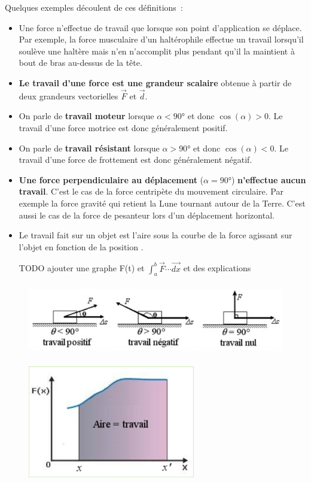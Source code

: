\begin{multicols}{2}
Quelques exemples découlent de ces définitions~:
\begin{itemize}
\item   Une force n'effectue de travail que lorsque son point d'application se
  déplace. Par exemple, la force
musculaire d'un haltérophile effectue un travail lorsqu'il soulève une
haltère mais n'en n'accomplit
plus pendant qu'il la maintient à bout de bras au-dessus de la tête.
\item   \textbf{Le travail d'une force est une grandeur scalaire} obtenue à
  partir de deux grandeurs vectorielles $\vec{F}$ et  $\vec{d}$.
\item   On parle de \textbf{travail moteur} lorsque $\alpha < 90°$ et donc
  $ \cos(\alpha) > 0$. Le travail d'une force motrice est donc 
  généralement positif.
\item   On parle de \textbf{travail résistant} lorsque $\alpha > 90°$ et
  donc $\cos(\alpha) < 0$. Le travail d'une force de frottement est 
  donc généralement négatif.
\item   \textbf{Une force perpendiculaire au déplacement} ($\alpha = 90°$)
  \textbf{n'effectue aucun travail}.
C'est le cas de la force centripète du mouvement circulaire. Par exemple la 
force gravité qui retient la Lune tournant autour de la Terre. C'est aussi le cas 
de la force de pesanteur lors d'un déplacement horizontal.
\item   Le travail fait sur un objet est l'aire sous la courbe de la force
  agissant sur l'objet en fonction de la position .

  TODO ajouter une graphe F(t) et $\int_a^b \vec{F} \cdots \vec{dx}$ et des explications 
  
\end{itemize}


\begin{figure}
\centering
\includegraphics[width=12.989cm,height=3.115cm]{Pictures/1000000100000709000001B0D92B14C6C126C9B7.png}
\caption{}
\end{figure}

\begin{figure}
\centering
\includegraphics[width=7.292cm,height=4.895cm]{Pictures/100000010000031F00000218321A1B2B64E50C1E.png}
\caption{}
\end{figure}


\end{multicols}
